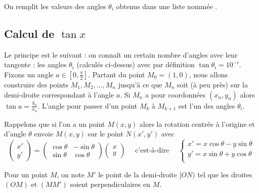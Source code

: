 \documentclass[class=report,crop=false]{standalone}
\begin{document}
On remplit les valeurs des angles $\theta_i$ obtenus dans une liste nommée .


\subsection{Calcul de $\tan x$}


Le principe est le suivant : on connaît un certain nombre d'angles avec leur tangente : les angles $\theta_i$
(calculés ci-dessus) avec par définition $\tan \theta_i = 10^{-i}$.
Fixons un angle $a \in [0,\frac\pi2]$.
Partant du point $M_0 = (1,0)$, nous allons construire des points $M_1,M_2,\ldots,M_n$
jusqu'à ce que $M_n$ soit (à peu près) sur la demi-droite correspondant à l'angle $a$.
Si $M_n$ a pour coordonnées $(x_n,y_n)$ alors $\tan a = \frac{y_n}{x_n}$.
L'angle pour passer d'un point $M_k$ à $M_{k+1}$ est l'un des angles $\theta_i$.


Rappelons que si l'on a un point $M(x,y)$ alors la rotation centrée à l'origine et d'angle $\theta$
envoie $M(x,y)$ sur le point $N(x',y')$ avec
$$\begin{pmatrix} x' \\ y' \end{pmatrix}
= \begin{pmatrix} \cos \theta & - \sin \theta \\ \sin \theta & \cos \theta \end{pmatrix}
\begin{pmatrix} x \\y \end{pmatrix}
\quad \text{ c'est-à-dire } \quad
\left\{ \begin{array}{rcl}
        x' = x \cos \theta - y \sin \theta \\
        y' = x \sin \theta + y \cos \theta \\
        \end{array}
\right. $$

Pour un point $M$, on note $M'$ le point de la demi-droite $[ON)$ tel que les droites $(OM)$
et $(MM')$ soient perpendiculaires en $M$.

\end{document}
